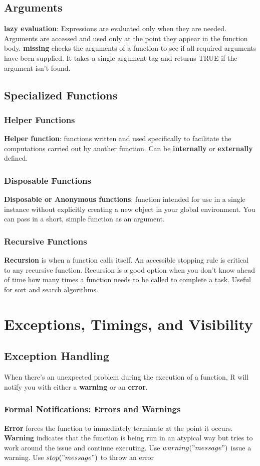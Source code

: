 \documentclass[openany]{book}
\begin{document}
\begin{flushleft}
\section{Arguments}
\textbf{lazy evaluation}: Expressions are evaluated only when they are needed. Arguments are accessed and used only at the point they appear in the function body. \medbreak
\textbf{missing} checks the arguments of a function to see if all required arguments have been supplied. It takes a single argument tag and returns TRUE if the argument isn't found. \medbreak
\section{Specialized Functions}
\subsection{Helper Functions}
\textbf{Helper function}: functions written and used specifically to facilitate the computations carried out by another function. \medbreak
Can be \textbf{internally} or \textbf{externally} defined.
\subsection{Disposable Functions}
\textbf{Disposable or Anonymous functions}: function intended for use in a single instance without explicitly creating a new object in your global environment. \medbreak
You can pass in a short, simple function as an argument.
\subsection{Recursive Functions}
\textbf{Recursion} is when a function calls itself. \medbreak
An accessible stopping rule is critical to any recursive function. \medbreak
Recursion is a good option when you don't know ahead of time how many times a function needs to be called to complete a task. Useful for sort and search algorithms.
\chapter{Exceptions, Timings, and Visibility}
\section{Exception Handling}
When there's an unexpected problem during the execution of a function, R will notify you with either a \textbf{warning} or an \textbf{error}.
\subsection{Formal Notifications: Errors and Warnings}
\textbf{Error} forces the function to immediately terminate at the point it occurs. \medbreak
\textbf{Warning} indicates that the function is being run in an atypical way but tries to work around the issue and continue executing. \medbreak
Use $warning("message")$ issue a warning. \medbreak
Use $stop("message")$ to throw an error \medbreak

\end{flushleft}
\end{document}
